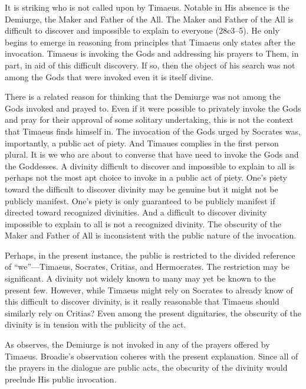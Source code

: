 It is striking who is not called upon by Timaeus. Notable in His absence is the Demiurge, the Maker and Father of the All. The Maker and Father of the All is difficult to discover and impossible to explain to everyone (28c3–5). He only begins to emerge in reasoning from principles that Timaeus only states after the invocation. Timaeus is invoking the Gods and addressing his prayers to Them, in part, in aid of this difficult discovery. If so, then the object of his search was not among the Gods that were invoked even it is itself divine.

There is a related reason for thinking that the Demiurge was not among the Gods invoked and prayed to. Even if it were possible to privately invoke the Gods and pray for their approval of some solitary undertaking, this is not the context that Timaeus finds himself in. The invocation of the Gods urged by Socrates was, importantly, a public act of piety. And Timaues complies in the first person plural. It is we who are about to converse that have need to invoke the Gods and the Goddesses. A divinity difficult to discover and impossible to explain to all is perhaps not the most apt choice to invoke in a public act of piety. One's piety toward the difficult to discover divinity may be genuine but it might not be publicly manifest. One's piety is only guaranteed to be publicly manifest if directed toward recognized divinities. And a difficult to discover divinity impossible to explain to all is not a recognized divinity. The obscurity of the Maker and Father of All is inconsistent with the public nature of the invocation.

Perhaps, in the present instance, the public is restricted to the divided reference of ``we''---Timaeus, Socrates, Critias, and Hermocrates. The restriction may be significant. A divinity not widely known to many may yet be known to the present few. However, while Timaeus might rely on Socrates to already know of this difficult to discover divinity, is it really reasonable that Timaeus should similarly rely on Critias? Even among the present dignitaries, the obscurity of the divinity is in tension with the publicity of the act.

As \citet[13--4]{Broadie:2012vl} observes, the Demiurge is not invoked in any of the prayers offered by Timaeus. Broadie's observation coheres with the present explanation. Since all of the prayers in the dialogue are public acts, the obscurity of the divinity would preclude His public invocation.

